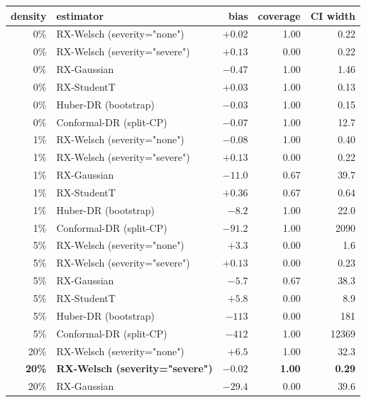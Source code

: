 \begin{table}[!t]
\centering
\scriptsize
\begin{tabular}{rlrrr}
\toprule
density & estimator & bias & coverage & CI width \\
\midrule
0\%   & RX-Welsch (severity="none")      & $+0.02$    & 1.00 & 0.22 \\
0\%   & RX-Welsch (severity="severe")    & $+0.13$    & 0.00 & 0.22 \\
0\%   & RX-Gaussian                    & $-0.47$    & 1.00 & 1.46 \\
0\%   & RX-StudentT                    & $+0.03$    & 1.00 & 0.13 \\
0\%   & Huber-DR (bootstrap)           & $-0.03$    & 1.00 & 0.15 \\
0\%   & Conformal-DR (split-CP)        & $-0.07$    & 1.00 & 12.7 \\
\midrule
1\%   & RX-Welsch (severity="none")      & $-0.08$    & 1.00 & 0.40 \\
1\%   & RX-Welsch (severity="severe")    & $+0.13$    & 0.00 & 0.22 \\
1\%   & RX-Gaussian                    & $-11.0$    & 0.67 & 39.7 \\
1\%   & RX-StudentT                    & $+0.36$    & 0.67 & 0.64 \\
1\%   & Huber-DR (bootstrap)           & $-8.2$     & 1.00 & 22.0 \\
1\%   & Conformal-DR (split-CP)        & $-91.2$    & 1.00 & 2090 \\
\midrule
5\%   & RX-Welsch (severity="none")      & $+3.3$     & 0.00 & 1.6 \\
5\%   & RX-Welsch (severity="severe")    & $+0.13$    & 0.00 & 0.23 \\
5\%   & RX-Gaussian                    & $-5.7$     & 0.67 & 38.3 \\
5\%   & RX-StudentT                    & $+5.8$     & 0.00 & 8.9 \\
5\%   & Huber-DR (bootstrap)           & $-113$     & 0.00 & 181 \\
5\%   & Conformal-DR (split-CP)        & $-412$     & 1.00 & 12369 \\
\midrule
20\%  & RX-Welsch (severity="none")      & $+6.5$     & 1.00 & 32.3 \\
\textbf{20\%}  & \textbf{RX-Welsch (severity="severe")} & $\mathbf{-0.02}$ & \textbf{1.00} & \textbf{0.29} \\
20\%  & RX-Gaussian                    & $-29.4$    & 0.00 & 39.6 \\

\end{tabular}
\end{table}
